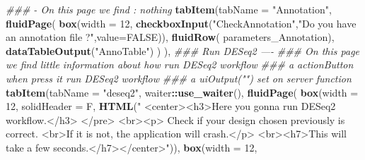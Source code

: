 \documentclass[
  12pt,
]{article}
\newenvironment{Shaded}{\begin{snugshade}}{\end{snugshade}}
\newcommand{\CommentTok}[1]{\textcolor[rgb]{0.56,0.35,0.01}{\textit{#1}}}
\newcommand{\DataTypeTok}[1]{\textcolor[rgb]{0.13,0.29,0.53}{#1}}
\newcommand{\DecValTok}[1]{\textcolor[rgb]{0.00,0.00,0.81}{#1}}
\newcommand{\KeywordTok}[1]{\textcolor[rgb]{0.13,0.29,0.53}{\textbf{#1}}}
\newcommand{\NormalTok}[1]{#1}
\newcommand{\OperatorTok}[1]{\textcolor[rgb]{0.81,0.36,0.00}{\textbf{#1}}}
\newcommand{\OtherTok}[1]{\textcolor[rgb]{0.56,0.35,0.01}{#1}}
\newcommand{\StringTok}[1]{\textcolor[rgb]{0.31,0.60,0.02}{#1}}
\begin{document}
\begin{Shaded}
\begin{Highlighting}[]
            \CommentTok{###               - On this page we find : nothing }
              \KeywordTok{tabItem}\NormalTok{(}\DataTypeTok{tabName =} \StringTok{"Annotation"}\NormalTok{,}
                    \KeywordTok{fluidPage}\NormalTok{(}
                      \KeywordTok{box}\NormalTok{(}\DataTypeTok{width =} \DecValTok{12}\NormalTok{,}
                          \KeywordTok{checkboxInput}\NormalTok{(}\StringTok{"CheckAnnotation"}\NormalTok{,}\StringTok{"Do you have an annotation file ?"}\NormalTok{,}\DataTypeTok{value=}\OtherTok{FALSE}\NormalTok{)),}
                      \KeywordTok{fluidRow}\NormalTok{(}
\NormalTok{                        parameters_Annotation),}
                      \KeywordTok{dataTableOutput}\NormalTok{(}\StringTok{"AnnoTable"}\NormalTok{)}
\NormalTok{                    )}
\NormalTok{            ),}
            \CommentTok{### Run DESeq2 ----}
            \CommentTok{### On this page we find little information about how run DESeq2 workflow}
            \CommentTok{### a actionButton when press it run DESeq2 workflow }
            \CommentTok{### a uiOutput("") set on server function}
            \KeywordTok{tabItem}\NormalTok{(}\DataTypeTok{tabName =} \StringTok{"deseq2"}\NormalTok{,}
\NormalTok{                    waiter}\OperatorTok{::}\KeywordTok{use_waiter}\NormalTok{(),}
                    \KeywordTok{fluidPage}\NormalTok{(}
                      \KeywordTok{box}\NormalTok{(}\DataTypeTok{width =} \DecValTok{12}\NormalTok{, }\DataTypeTok{solidHeader =}\NormalTok{ F,}
                          \KeywordTok{HTML}\NormalTok{(}\StringTok{" <center><h3>Here you gonna run DESeq2 workflow.</h3> </pre>}
\StringTok{                               <br><p> Check if your design chosen previously is correct.}
\StringTok{                               <br>If it is not, the application will crash.</p>}
\StringTok{                               <br><h7>This will take a few seconds.</h7></center>"}\NormalTok{)),}
                      \KeywordTok{box}\NormalTok{(}\DataTypeTok{width =} \DecValTok{12}\NormalTok{,}


\end{Highlighting}
\end{Shaded}
\end{document}
